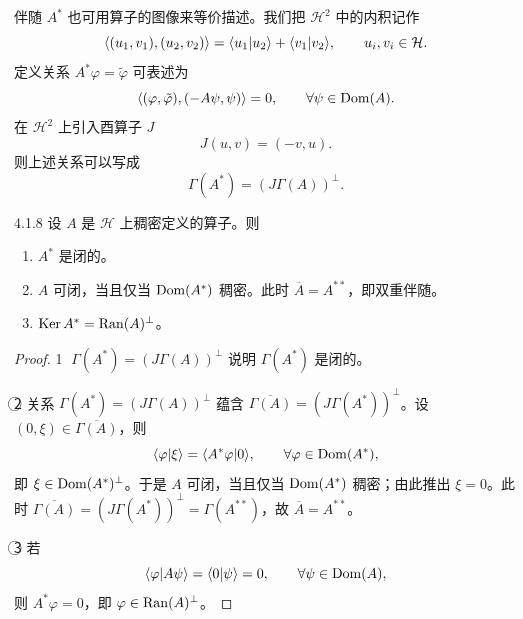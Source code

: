 伴随 $A^*$ 也可用算子的图像来等价描述。我们把 $\mathcal{H}^2$ 中的内积记作
\[
\left\langle (u_1,v_1),(u_2,v_2)\right\rangle=\langle u_1|u_2\rangle+\langle v_1|v_2\rangle,\qquad u_i,v_i\in\mathcal{H}.
\]
定义关系 $A^*\varphi=\tilde\varphi$ 可表述为
\[
\left\langle (\varphi,\tilde\varphi),(-A\psi,\psi)\right\rangle=0,\qquad\forall\psi\in\operatorname{Dom}(A).
\]
在 $\mathcal{H}^2$ 上引入酉算子 $J$
\[
J(u,v)=(-v,u).
\]
则上述关系可以写成
\[
\Gamma(A^*)=(J\Gamma(A))^\perp.
\]

\begin{proposition}{4.1.8}
  设 $A$ 是 $\mathcal{H}$ 上稠密定义的算子。则
  \begin{enumerate}[label=\textcircled{\small\arabic*},leftmargin=2.6em,itemsep=2pt]
    \item $A^*$ 是闭的。
    \item $A$ 可闭，当且仅当 $\operatorname{Dom}(A^*)$ 稠密。此时 $\overline{A}=A^{**}$，即双重伴随。
    \item $\operatorname{Ker} A^*=\operatorname{Ran}(A)^\perp$。
  \end{enumerate}
\end{proposition}

\begin{proof}
  \textcircled{\small 1} $\Gamma(A^*)=(J\Gamma(A))^\perp$ 说明 $\Gamma(A^*)$ 是闭的。

  \textcircled{\small 2} 关系 $\Gamma(A^*)=(J\Gamma(A))^\perp$ 蕴含 $\overline{\Gamma(A)}=(J\Gamma(A^*))^\perp$。设 $(0,\xi)\in\overline{\Gamma(A)}$，则
  \[
  \langle \varphi|\xi\rangle=\langle A^*\varphi|0\rangle,\qquad\forall\varphi\in\operatorname{Dom}(A^*),
  \]
  即 $\xi\in\operatorname{Dom}(A^*)^\perp$。于是 $A$ 可闭，当且仅当 $\operatorname{Dom}(A^*)$ 稠密；由此推出 $\xi=0$。此时 $\overline{\Gamma(A)}=(J\Gamma(A^*))^\perp=\Gamma(A^{**})$，故 $\overline{A}=A^{**}$。

  \textcircled{\small 3} 若
  \[
  \langle \varphi|A\psi\rangle=\langle 0|\psi\rangle=0,\qquad\forall\psi\in\operatorname{Dom}(A),
  \]
  则 $A^*\varphi=0$，即 $\varphi\in\operatorname{Ran}(A)^\perp$。
\end{proof}

